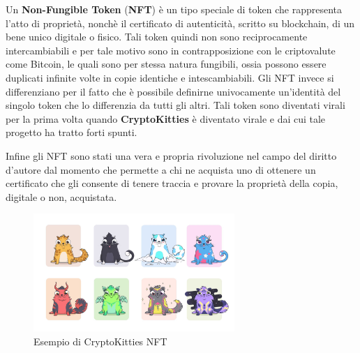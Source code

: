 Un \textbf{Non-Fungible Token} (\textbf{NFT}) è un tipo speciale di token che rappresenta l'atto di proprietà, nonchè il certificato di autenticità, scritto su blockchain, di un bene unico digitale o fisico. Tali token quindi non sono reciprocamente intercambiabili e per tale motivo sono in contrapposizione con le criptovalute come Bitcoin, le quali sono per stessa natura fungibili, ossia possono essere duplicati infinite volte in copie identiche e intescambiabili. Gli NFT invece si differenziano per il fatto che è possibile definirne univocamente un'identità del singolo token che lo differenzia da tutti gli altri. Tali token sono diventati virali per la prima volta quando \textbf{CryptoKitties} \cite{web:ck} è diventato virale e dai cui tale progetto ha tratto forti spunti.

Infine gli NFT sono stati una vera e propria rivoluzione nel campo del diritto d'autore dal momento che permette a chi ne acquista uno di ottenere un certificato che gli consente di tenere traccia e provare la proprietà della copia, digitale o non, acquistata.

\begin{figure}[h]
    \centering
    \includegraphics[width=0.68\textwidth]{tesina/img/NFT.png}
    \caption{Esempio di CryptoKitties NFT}
\end{figure}